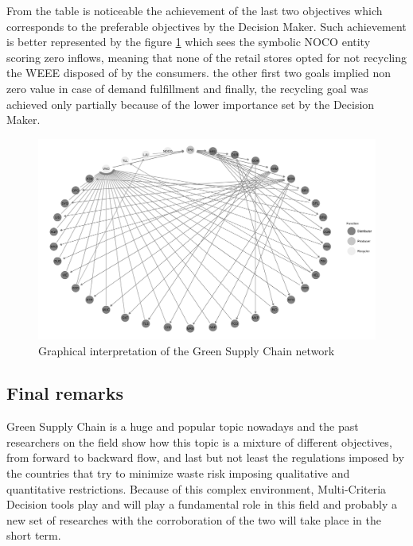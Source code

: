 \begin{doublespace}
From the table is noticeable the achievement of the last two objectives which corresponds to the preferable objectives by the Decision Maker. Such achievement is better represented by the figure \ref{fig:network} which sees the symbolic NOCO entity scoring zero inflows, meaning that none of the retail stores opted for not recycling the WEEE disposed of by the consumers. the other first two goals implied non zero value in case of demand fulfillment and finally, the recycling goal was achieved only partially because of the lower importance set by the Decision Maker. 

\begin{figure}
\centering
\includegraphics[width=\textwidth]{Images/network.png}
\caption{Graphical interpretation of the Green Supply Chain network}
\label{fig:network}
\end{figure}

\subsection{Final remarks}
Green Supply Chain is a huge and popular topic nowadays and the past researchers on the field show how this topic is a mixture of different objectives, from forward to backward flow, and last but not least the regulations imposed by the countries that try to minimize waste risk imposing qualitative and quantitative restrictions. Because of this complex environment, Multi-Criteria Decision tools play and will play a fundamental role in this field and probably a new set of researches with the corroboration of the two will take place in the short term.

\end{doublespace}
